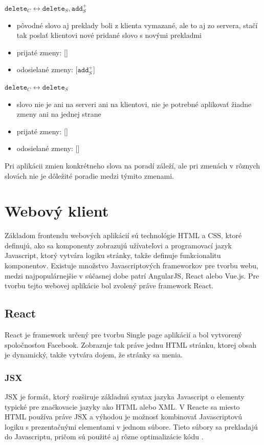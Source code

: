 \documentclass[
  digital, %
  table,   %
  lof,     %
  lot,     %
]{fithesis3}
\begin{document}
\noindent
$\texttt{delete}_{C} \longleftrightarrow \texttt{delete}_{S}, \texttt{add}_{S}^+$
\begin{itemize}
\item pôvodné slovo aj preklady boli z klienta vymazané, ale to aj zo servera, stačí tak poslať klientovi nové pridané slovo s novými prekladmi
\item prijaté zmeny: []
\item odosielané zmeny: [$\texttt{add}_{S}^+$]
\end{itemize}

\noindent
$\texttt{delete}_{C} \longleftrightarrow \texttt{delete}_{S}$
\begin{itemize}
\item slovo nie je ani na serveri ani na klientovi, nie je potrebné aplikovať žiadne zmeny ani na jednej strane
\item prijaté zmeny: []
\item odosielané zmeny: []
\end{itemize}

Pri aplikácii zmien konkrétneho slova na poradí záleží, ale pri zmenách v rôznych slovách nie je dôležité poradie medzi týmito zmenami.





\chapter{Webový klient}
Základom frontendu webových aplikácií sú technológie HTML a CSS, ktoré definujú, ako sa komponenty zobrazujú užívateľovi a programovací jazyk Javascript, ktorý vytvára logiku stránky, takže definuje funkcionalitu komponentov. Existuje množstvo Javascriptových frameworkov pre tvorbu webu, medzi najpopulárnejšie v súčasnej dobe patrí AngularJS, React alebo Vue.js. Pre tvorbu tejto webovej aplikácie bol zvolený práve framework React.

\section{React}
React je framework určený pre tvorbu Single page aplikácií a bol vytvorený spoločnosťou Facebook. Zobrazuje tak práve jednu HTML stránku, ktorej obsah je dynamický, takže vytvára dojem, že stránky sa menia.

\subsection{JSX}
JSX je formát, ktorý rozširuje základnú syntax jazyka Javascript o elementy typické pre značkovacie jazyky ako HTML alebo XML. V Reacte sa miesto HTML používa práve JSX a výhodou je možnosť kombinovať Javascriptovú logiku s prezentačnými elementami v jednom súbore. Tieto súbory sa prekladajú do Javascriptu, pričom sú použité aj rôzne optimalizácie kódu \parencite{gackenheimer2015react}.
\end{document}

